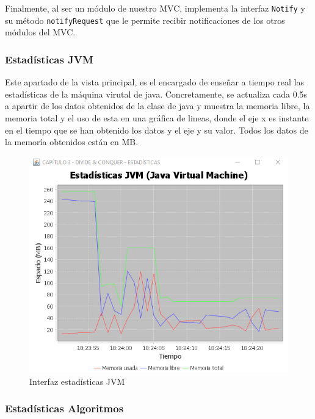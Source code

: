 Finalmente, al ser un módulo de nuestro MVC, implementa la interfaz \texttt{Notify} y su método \texttt{notifyRequest} que le permite recibir notificaciones de los otros módulos del MVC.

\subsubsection{Estadísticas JVM}\label{Stats JVM}

Este apartado de la vista principal, es el encargado de enseñar a tiempo real las estadísticas de la máquina virutal de java. Concretamente, se actualiza cada 0.5s a apartir de los datos obtenidos de la clase de java  y muestra la memoria libre, la memoria total y el uso de esta en una gráfica de lineas, donde el eje x es instante en el tiempo que se han obtenido los datos y el eje y su valor. Todos los datos de la memoría obtenidos están en MB.

\begin{figure}[!h]
    \centering
    \includegraphics[width=\linewidth]{MVC/View/img/stats-jvm.png}
    \caption{Interfaz estadísticas JVM}
    \label{fig:Ejemplo stats JVM}
\end{figure}

\subsubsection{Estadísticas Algoritmos}\label{Stats Algt}

